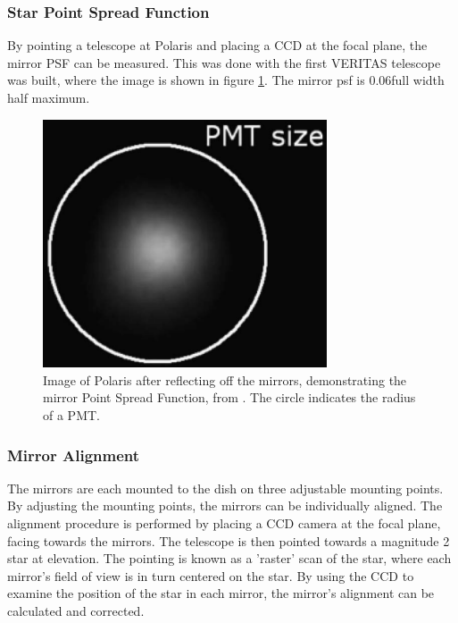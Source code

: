 \subsubsection{Star Point Spread Function}

By pointing a telescope at Polaris and placing a CCD at the focal plane, the mirror PSF can be measured.
This was done with the first VERITAS telescope was built, where the image is shown in figure \ref{fig:mirrorpolaris}.
The mirror psf is 0.06\degree full width half maximum\cite{Veritas_Detector}.

\begin{figure}[h]
  \begin{center}
    \includegraphics[width=0.75\textwidth]{images/mirror_polaris.eps}
    \caption[Polaris PSF]{Image of Polaris after reflecting off the mirrors, demonstrating the mirror Point Spread Function, from \cite{Veritas_Detector}.  The circle indicates the radius of a PMT.}\label{fig:mirrorpolaris}
  \end{center}
\end{figure}

\subsubsection{Mirror Alignment}
The mirrors are each mounted to the dish on three adjustable mounting points.
By adjusting the mounting points, the mirrors can be individually aligned.
The alignment procedure is performed by placing a CCD camera at the focal plane, facing towards the mirrors.
The telescope is then pointed towards a magnitude 2 star at \degree elevation.
The pointing is known as a 'raster' scan of the star, where each mirror's field of view is in turn centered on the star.
By using the CCD to examine the position of the star in each mirror, the mirror's alignment can be calculated and corrected.



